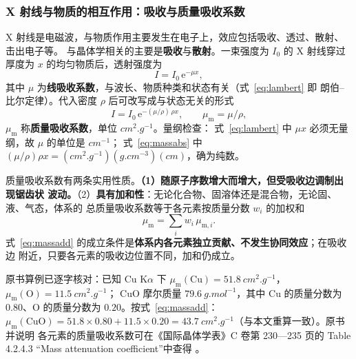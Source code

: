 \subsubsection{X 射线与物质的相互作用：吸收与质量吸收系数}

X 射线是电磁波，与物质作用主要发生在电子上，效应包括吸收、透过、散射、击出电子等。
与晶体学相关的主要是\textbf{吸收}与\textbf{散射}。一束强度为 $I_0$ 的 X 射线穿过厚度为
$x$ 的均匀物质后，透射强度为
\begin{equation}
I=I_0\,\mathrm{e}^{-\mu x},
\label{eq:lambert}
\end{equation}
其中 $\mu$ 为\textbf{线吸收系数}，与波长、物质种类和状态有关（式~\eqref{eq:lambert} 即
朗伯--比尔定律）。代入密度 $\rho$ 后可改写成与状态无关的形式
\begin{equation}
I=I_0\,\mathrm{e}^{-(\mu/\rho)\,\rho x},
\qquad \mu_{\mathrm{m}}=\mu/\rho ,
\label{eq:massabs}
\end{equation}
$\mu_{\mathrm{m}}$ 称\textbf{质量吸收系数}，单位 $\unit{cm^2.g^{-1}}$。量纲检查：
式~\eqref{eq:lambert} 中 $\mu x$ 必须无量纲，故 $\mu$ 的单位是 $\unit{cm^{-1}}$；
式~\eqref{eq:massabs} 中 $(\mu/\rho)\rho x=(\unit{cm^2.g^{-1}})(\unit{g.cm^{-3}})
(\unit{cm})$，确为纯数。

质量吸收系数有两条实用性质。\textbf{（1）随原子序数增大而增大，但受吸收边调制出现锯齿状
波动。}（2）\textbf{具有加和性}：无论化合物、固溶体还是混合物，无论固、液、气态，体系的
总质量吸收系数等于各元素按质量分数 $w_i$ 的加权和
\begin{equation}
\mu_{\mathrm{m}}=\sum_i w_i\,\mu_{\mathrm{m},i}.
\label{eq:massadd}
\end{equation}
式~\eqref{eq:massadd} 的成立条件是\textbf{体系内各元素独立贡献、不发生协同效应}；在吸收边
附近，只要各元素的吸收边位置不同，加和仍成立。

\begin{example}
原书算例已逐字核对：已知 Cu K$\alpha$ 下 $\mu_{\mathrm{m}}(\mathrm{Cu})
=\qty{51.8}{cm^2.g^{-1}}$，$\mu_{\mathrm{m}}(\mathrm{O})=\qty{11.5}{cm^2.g^{-1}}$；
CuO 摩尔质量 $\qty{79.6}{g.mol^{-1}}$，其中 Cu 的质量分数为 $0.80$、O 的质量分数为
$0.20$。按式~\eqref{eq:massadd}：$\mu_{\mathrm{m}}(\mathrm{CuO})
=51.8\times0.80+11.5\times0.20=\qty{43.7}{cm^2.g^{-1}}$（与本文重算一致）。原书并说明
各元素的质量吸收系数可在《国际晶体学表》C 卷第 230—235 页的 Table 4.2.4.3
“Mass attenuation coefficient”中查得
。
\end{example}

